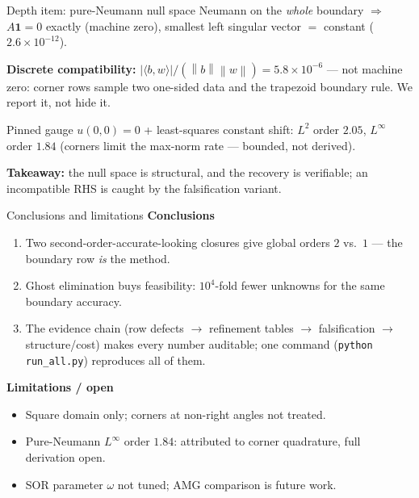\documentclass[aspectratio=169,11pt]{beamer}
\newcommand{\norm}[1]{\left\lVert #1 \right\rVert}
\begin{document}
\begin{frame}{Depth item: pure-Neumann null space}
Neumann on the \emph{whole} boundary $\Rightarrow$ $A\bm{1}=0$ exactly
(machine zero), smallest left singular vector $=$ constant
($2.6\times10^{-12}$).

\bigskip
\textbf{Discrete compatibility:} $|\langle b,w\rangle|/(\norm{b}\norm{w})
= 5.8\times10^{-6}$ --- not machine zero: corner rows sample two
one-sided data and the trapezoid boundary rule. We report it, not hide it.

\bigskip
Pinned gauge $u(0,0)=0$ + least-squares constant shift:
$L^{2}$ order $2.05$, $L^{\infty}$ order $1.84$
(corners limit the max-norm rate --- bounded, not derived).

\textbf{Takeaway:} the null space is structural, and the recovery is
verifiable; an incompatible RHS is caught by the falsification variant.
\end{frame}

\begin{frame}{Conclusions and limitations}
\textbf{Conclusions}
\begin{enumerate}
\item Two second-order-accurate-looking closures give global orders
      $2$ vs.\ $1$ --- the boundary row \emph{is} the method.
\item Ghost elimination buys feasibility: $10^{4}$-fold fewer unknowns
      for the same boundary accuracy.
\item The evidence chain (row defects $\rightarrow$ refinement tables
      $\rightarrow$ falsification $\rightarrow$ structure/cost) makes
      every number auditable; one command
      (\texttt{python run\_all.py}) reproduces all of them.
\end{enumerate}

\bigskip
\textbf{Limitations / open}
\begin{itemize}
\item Square domain only; corners at non-right angles not treated.
\item Pure-Neumann $L^{\infty}$ order $1.84$: attributed to corner
      quadrature, full derivation open.
\item SOR parameter $\omega$ not tuned; AMG comparison is future work.
\end{itemize}
\end{frame}
\end{document}
